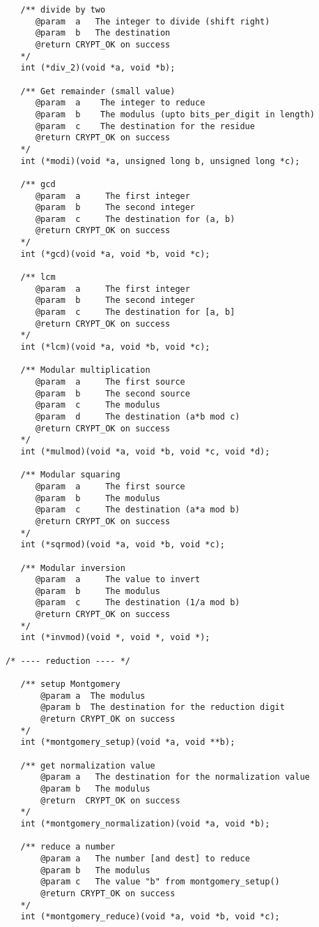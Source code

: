 \documentclass[synpaper]{book}
\begin{document}
\begin{small}
\begin{verbatim}
   /** divide by two
      @param  a   The integer to divide (shift right)
      @param  b   The destination
      @return CRYPT_OK on success
   */
   int (*div_2)(void *a, void *b);

   /** Get remainder (small value)
      @param  a    The integer to reduce
      @param  b    The modulus (upto bits_per_digit in length)
      @param  c    The destination for the residue
      @return CRYPT_OK on success
   */
   int (*modi)(void *a, unsigned long b, unsigned long *c);

   /** gcd
      @param  a     The first integer
      @param  b     The second integer
      @param  c     The destination for (a, b)
      @return CRYPT_OK on success
   */
   int (*gcd)(void *a, void *b, void *c);

   /** lcm
      @param  a     The first integer
      @param  b     The second integer
      @param  c     The destination for [a, b]
      @return CRYPT_OK on success
   */
   int (*lcm)(void *a, void *b, void *c);

   /** Modular multiplication
      @param  a     The first source
      @param  b     The second source
      @param  c     The modulus
      @param  d     The destination (a*b mod c)
      @return CRYPT_OK on success
   */
   int (*mulmod)(void *a, void *b, void *c, void *d);

   /** Modular squaring
      @param  a     The first source
      @param  b     The modulus
      @param  c     The destination (a*a mod b)
      @return CRYPT_OK on success
   */
   int (*sqrmod)(void *a, void *b, void *c);

   /** Modular inversion
      @param  a     The value to invert
      @param  b     The modulus
      @param  c     The destination (1/a mod b)
      @return CRYPT_OK on success
   */
   int (*invmod)(void *, void *, void *);

/* ---- reduction ---- */

   /** setup Montgomery
       @param a  The modulus
       @param b  The destination for the reduction digit
       @return CRYPT_OK on success
   */
   int (*montgomery_setup)(void *a, void **b);

   /** get normalization value
       @param a   The destination for the normalization value
       @param b   The modulus
       @return  CRYPT_OK on success
   */
   int (*montgomery_normalization)(void *a, void *b);

   /** reduce a number
       @param a   The number [and dest] to reduce
       @param b   The modulus
       @param c   The value "b" from montgomery_setup()
       @return CRYPT_OK on success
   */
   int (*montgomery_reduce)(void *a, void *b, void *c);


\end{verbatim}
\end{small}
\end{document}
